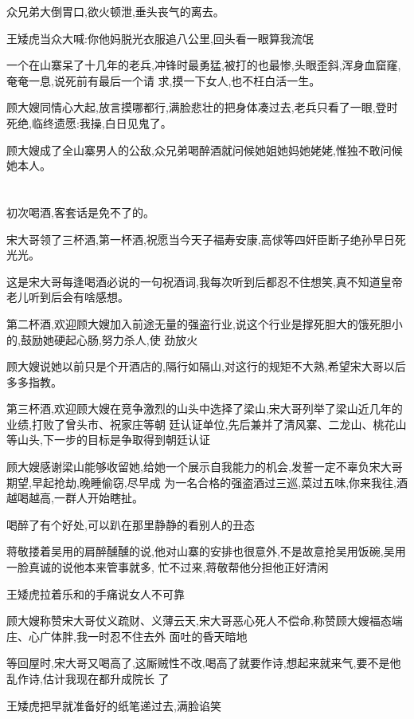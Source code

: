 ﻿\documentclass[12pt]{article}
\begin{document}
众兄弟大倒胃口,欲火顿泄,垂头丧气的离去。

王矮虎当众大喊:你他妈脱光衣服追八公里,回头看一眼算我流氓\dldots

一个在山寨呆了十几年的老兵,冲锋时最勇猛,被打的也最惨,头眼歪斜,浑身血窟窿,奄奄一息,说死前有最后一个请
求,摸一下女人,也不枉白活一生。

顾大嫂同情心大起,放言摸哪都行,满脸悲壮的把身体凑过去,老兵只看了一眼,登时死绝,临终遗愿:我操,白日见鬼了。

顾大嫂成了全山寨男人的公敌,众兄弟喝醉酒就问候她姐她妈她姥姥,惟独不敢问候她本人。

\section{}

初次喝酒,客套话是免不了的。

宋大哥领了三杯酒,第一杯酒,祝愿当今天子福寿安康,高俅等四奸臣断子绝孙早日死光光。

这是宋大哥每逢喝酒必说的一句祝酒词,我每次听到后都忍不住想笑,真不知道皇帝老儿听到后会有啥感想。

第二杯酒,欢迎顾大嫂加入前途无量的强盗行业,说这个行业是撑死胆大的饿死胆小的,鼓励她硬起心肠,努力杀人,使
劲放火\dldots

顾大嫂说她以前只是个开酒店的,隔行如隔山,对这行的规矩不大熟,希望宋大哥以后多多指教。

第三杯酒,欢迎顾大嫂在竞争激烈的山头中选择了梁山,宋大哥列举了梁山近几年的业绩,打败了曾头市、祝家庄等朝
廷认证单位,先后兼并了清风寨、二龙山、桃花山等山头,下一步的目标是争取得到朝廷认证

顾大嫂感谢梁山能够收留她,给她一个展示自我能力的机会,发誓一定不辜负宋大哥期望,早起抢劫,晚睡偷窃,尽早成
为一名合格的强盗酒过三巡,菜过五味,你来我往,酒越喝越高,一群人开始瞎扯。

喝醉了有个好处,可以趴在那里静静的看别人的丑态

蒋敬搂着吴用的肩醉醺醺的说,他对山寨的安排也很意外,不是故意抢吴用饭碗,吴用一脸真诚的说他本来管事就多,
忙不过来,蒋敬帮他分担他正好清闲\dldots

王矮虎拉着乐和的手痛说女人不可靠\dldots

顾大嫂称赞宋大哥仗义疏财、义薄云天,宋大哥恶心死人不偿命,称赞顾大嫂福态端庄、心广体胖,我一时忍不住去外
面吐的昏天暗地\dldots

等回屋时,宋大哥又喝高了,这厮贼性不改,喝高了就要作诗,想起来就来气,要不是他乱作诗,估计我现在都升成院长
了

王矮虎把早就准备好的纸笔递过去,满脸谄笑
\end{document}
